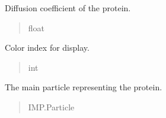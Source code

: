 \documentclass[letterpaper,10pt,english]{sphinxmanual}
\begin{document}
\begin{fulllineitems}
\begin{fulllineitems}
\label{\detokenize{src:src.Protein_Class.Protein.diffcoff}}
\pysigstartsignatures
{}
\pysigstopsignatures
\sphinxAtStartPar
Diffusion coefficient of the protein.
\begin{quote}\begin{description}
\sphinxAtStartPar
float

\end{description}\end{quote}

\end{fulllineitems}


\begin{fulllineitems}
\label{\detokenize{src:src.Protein_Class.Protein.color}}
\pysigstartsignatures
{}
\pysigstopsignatures
\sphinxAtStartPar
Color index for display.
\begin{quote}\begin{description}
\sphinxAtStartPar
int

\end{description}\end{quote}

\end{fulllineitems}


\begin{fulllineitems}
\label{\detokenize{src:src.Protein_Class.Protein.protp}}
\pysigstartsignatures
{}
\pysigstopsignatures
\sphinxAtStartPar
The main particle representing the protein.
\begin{quote}\begin{description}
\sphinxAtStartPar
IMP.Particle

\end{description}\end{quote}

\end{fulllineitems}



\end{fulllineitems}
\end{document}
